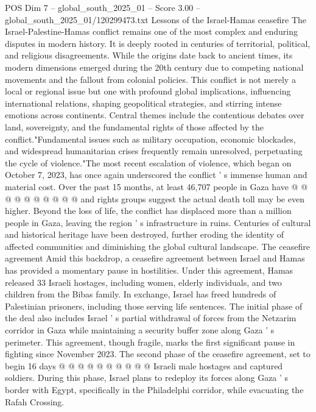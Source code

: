 \begin{textsample}{POS Dim 7 – global\_south\_2025\_01 – Score 3.00 – global\_south\_2025\_01/120299473.txt}  \label{ex:f7_pos_250}
Lessons of the Israel-Hamas ceasefire The Israel-Palestine-Hamas conflict remains one of the most complex and enduring disputes in modern history.
It is deeply rooted in centuries of territorial, political, and religious disagreements.
While the origins date back to ancient times, its modern dimensions emerged during the 20th century due to competing national movements and the fallout from colonial policies.
This conflict is not merely a local or regional issue but one with profound global implications, influencing international relations, shaping geopolitical strategies, and stirring intense emotions across continents.
Central themes include the contentious debates over land, sovereignty, and the fundamental rights of those affected by the conflict."Fundamental issues such as military occupation, economic blockades, and widespread humanitarian crises frequently remain unresolved, perpetuating the cycle of violence."The most recent escalation of violence, which began on October 7, 2023, has once again underscored the conflict ' s immense human and material cost.
Over the past 15 months, at least 46,707 people in Gaza have @ @ @ @ @ @ @ @ @ @ and rights groups suggest the actual death toll may be even higher.
Beyond the loss of life, the conflict has displaced more than a million people in Gaza, leaving the region ' s infrastructure in ruins.
Centuries of cultural and historical heritage have been destroyed, further eroding the identity of affected communities and diminishing the global cultural landscape.
The ceasefire agreement Amid this backdrop, a ceasefire agreement between Israel and Hamas has provided a momentary pause in hostilities.
Under this agreement, Hamas released 33 Israeli hostages, including women, elderly individuals, and two children from the Bibas family.
In exchange, Israel has freed hundreds of Palestinian prisoners, including those serving life sentences.
The initial phase of the deal also includes Israel ' s partial withdrawal of forces from the Netzarim corridor in Gaza while maintaining a security buffer zone along Gaza ' s perimeter.
This agreement, though fragile, marks the first significant pause in fighting since November 2023.
The second phase of the ceasefire agreement, set to begin 16 days @ @ @ @ @ @ @ @ @ @ Israeli male hostages and captured soldiers.
During this phase, Israel plans to redeploy its forces along Gaza ' s border with Egypt, specifically in the Philadelphi corridor, while evacuating the Rafah Crossing.

\end{textsample}
